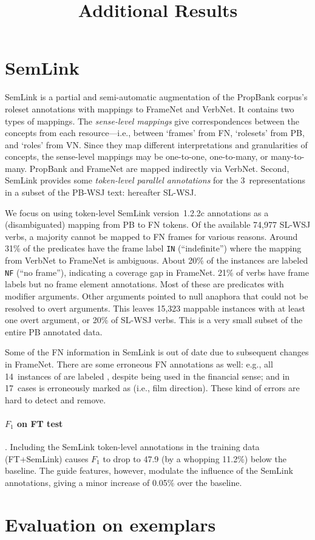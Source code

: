 \documentclass[a4paper,11pt,titlepage]{article}
\begin{document}
\title{Additional Results}

\maketitle

\section{SemLink}
SemLink \citep{bonial-13} is a partial and semi-automatic augmentation
of the PropBank corpus's roleset annotations with mappings to FrameNet and VerbNet.
It contains two types of mappings. The \emph{sense-level mappings} give correspondences between the concepts
from each resource---i.e., between `frames' from FN, `rolesets' from PB, and `roles' from VN.
Since they map different interpretations and granularities
of concepts, the sense-level mappings may be one-to-one, one-to-many, or many-to-many.
PropBank and FrameNet are mapped indirectly via VerbNet. %
Second, SemLink provides some \emph{token-level parallel annotations}
for the 3~representations in a subset of the PB-WSJ text: hereafter SL-WSJ.

We focus on using token-level SemLink version~1.2.2c annotations as a (disambiguated) mapping from PB to FN tokens.
Of the available 74,977 SL-WSJ verbs, a majority cannot be mapped to FN frames for various reasons.
Around 31\% of the predicates have the frame label \texttt{IN} (``indefinite'') where the mapping from VerbNet to FrameNet is ambiguous.
About 20\% of the instances are labeled \texttt{NF} (``no frame''), indicating a coverage gap in FrameNet.
21\% of verbs have frame labels but no frame element annotations. Most of these are predicates with modifier arguments.
Other arguments pointed to null anaphora that could not be resolved to overt arguments.
This leaves 15,323 mappable instances with at least one overt argument, or 20\% of SL-WSJ verbs. This is a very small
subset of the entire PB annotated data.

Some of the FN information in SemLink is out of date due to subsequent changes in FrameNet.
There are some erroneous FN annotations as well: e.g., all 14~instances of  are
labeled , despite being used in the financial sense; and in 17~cases 
is erroneously marked as  (i.e., film direction).
These kind of errors are hard to detect and remove.

\paragraph{$F_1$ on FT test}. Including the SemLink token-level annotations in the training data (FT+SemLink)
causes $F_1$ to drop to 47.9 (by a whopping 11.2\%) below the baseline. 
The guide features, however, modulate the influence of the SemLink annotations, 
giving a minor increase of 0.05\% over the baseline.


\section{Evaluation on exemplars}
\end{document}

